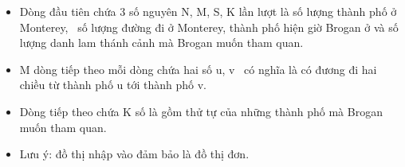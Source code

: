 \begin{itemize}
	\item Dòng đầu tiên chứa 3 số nguyên N, M, S, K lần lượt là số lượng thành phố ở Monterey,  số lượng đường đi ở Monterey, thành phố hiện giờ Brogan ở và số lượng danh lam thánh cảnh mà Brogan muốn tham quan.
	\item M dòng tiếp theo mỗi dòng chứa hai số u, v  có nghĩa là có đương đi hai chiều từ thành phố u tới thành phố v.
	\item Dòng tiếp theo chứa K số là gồm thử tự của những thành phố mà Brogan muốn tham quan.
	\item Lưu ý: đồ thị nhập vào đảm bảo là đồ thị đơn.
\end{itemize}